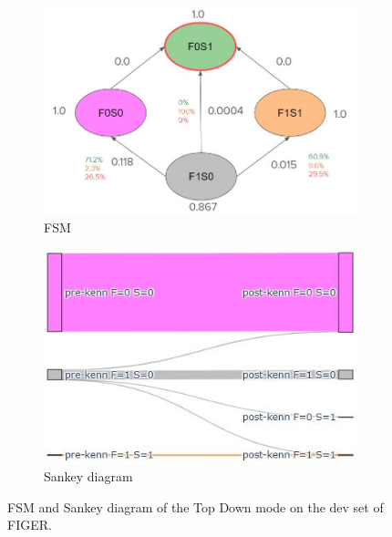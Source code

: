 \begin{figure}
     \centering
     \begin{subfigure}{0.7\textwidth}
         \centering
         \includegraphics[width=\textwidth]{figures/fsm_top_down.JPG}
         \caption{FSM}
         \label{fig:fsm_top_down}
         \vspace{15px}
     \end{subfigure}
     \vfill
     \begin{subfigure}{0.6\textwidth}
         \centering
         \includegraphics[width=\textwidth]{figures/sankey_top_down.JPG}
         \caption{Sankey diagram}
         \label{fig:sankey_top_down}
     \end{subfigure}
        \caption{FSM and Sankey diagram of the Top Down mode on the dev set of FIGER.}
        \label{fig:transitions_top_down}
\end{figure}

